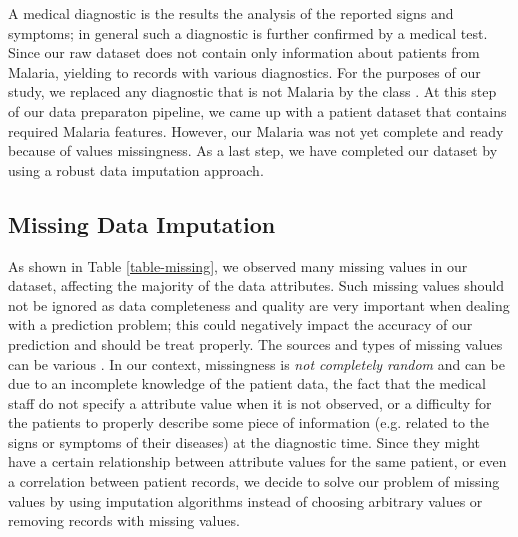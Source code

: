 A medical diagnostic is the results the analysis of the reported signs and symptoms; in general such a diagnostic is further confirmed by a medical test.
Since our raw dataset does not contain only information about patients from Malaria, yielding to records with various diagnostics. For the purposes of 
our study, we replaced any diagnostic that is not Malaria by the class . At this step of our data preparaton pipeline, we came 
up with a patient dataset that contains required Malaria features. However, our Malaria was not yet complete and ready because of values missingness.
As a last step, we have completed our dataset by using a robust data imputation approach.


\subsection{Missing Data Imputation}
As shown in Table \ref{table-missing}, we observed many missing values in our dataset, affecting the majority of the data attributes. Such missing values
should not be ignored as data completeness and quality are very important when dealing with a prediction problem; this could negatively impact the accuracy
of our prediction and should be treat properly. The sources and types of missing values can be various \cite{Al18}. In our context, missingness is \emph{not
completely random} and can be due to an incomplete knowledge of the patient data, the fact that the medical staff do not specify a attribute value when it is
not observed, or a difficulty for the patients to properly describe some piece of information (e.g. related to the signs or symptoms of their diseases) at the
diagnostic time. Since they might have a certain relationship between attribute values for the same patient, or even a correlation between patient records, we 
decide to solve our problem of missing values by using imputation algorithms instead of choosing arbitrary values or removing records with missing values.  

